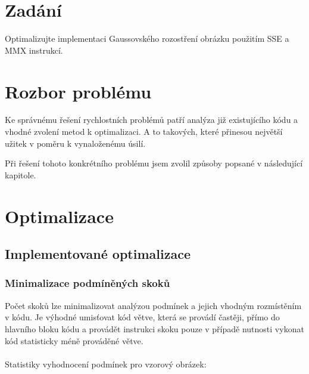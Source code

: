 \documentclass[12pt,a4paper,titlepage,final]{article}
\begin{document}
\newpage
\pagestyle{empty}

\def\author{Lukáš Vokráčko}
\def\email{xvokra00@stud.fit.vutbr.cz}
\def\projname{Semestrální projekt - řešení obvodů}



\tableofcontents

\newpage
\pagestyle{plain}
\setcounter{page}{1}

\section{Zadání}
	Optimalizujte implementaci Gaussovského rozostření obrázku použitím SSE a MMX instrukcí.

\section{Rozbor problému}
	Ke správnému řešení rychlostních problémů patří analýza již existujícího kódu a vhodné zvolení metod k optimalizaci.
	A to takových, které přinesou největší užitek v poměru k vynaloženému úsilí.

	Při řešení tohoto konkrétního problému jsem zvolil způsoby popsané v následující kapitole.

\section{Optimalizace}
	\subsection{Implementované optimalizace}
		\subsubsection{Minimalizace podmíněných skoků}
			Počet skoků lze minimalizovat analýzou podmínek a jejich vhodným rozmístěním v kódu.
			Je výhodné umisťovat kód větve, která se provádí častěji, přímo do hlavního bloku kódu
			a provádět instrukci skoku pouze v případě nutnosti vykonat kód statisticky méně prováděné větve.
			\\\\
			Statistiky vyhodnocení podmínek pro vzorový obrázek:
\end{document}
